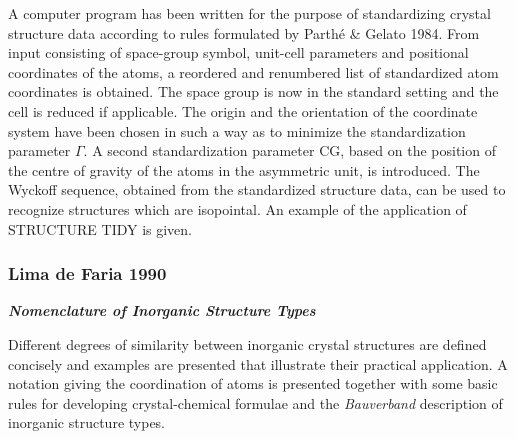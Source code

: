 \documentclass[11pt]{article}
\begin{document}
A computer program has been written for the purpose of standardizing
crystal structure data according to rules formulated by Parthé \& Gelato
1984. From input consisting of space-group symbol, unit-cell parameters
and positional coordinates of the atoms, a reordered and renumbered list
of standardized atom coordinates is obtained. The space group is now in
the standard setting and the cell is reduced if applicable. The origin
and the orientation of the coordinate system have been chosen in such a
way as to minimize the standardization parameter \(\Gamma\). A second
standardization parameter CG, based on the position of the centre of
gravity of the atoms in the asymmetric unit, is introduced. The Wyckoff
sequence, obtained from the standardized structure data, can be used to
recognize structures which are isopointal. An example of the application
of STRUCTURE TIDY is given.

    \subsubsection{Lima de Faria 1990}\label{lima-de-faria-1990}

\textbf{\emph{Nomenclature of Inorganic Structure Types}}

Different degrees of similarity between inorganic crystal structures are
defined concisely and examples are presented that illustrate their
practical application. A notation giving the coordination of atoms is
presented together with some basic rules for developing crystal-chemical
formulae and the \emph{Bauverband} description of inorganic structure
types.
\end{document}
